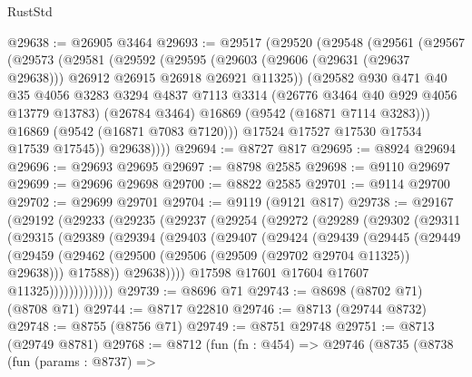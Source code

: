 \begin{lexlean}{RustStd}
\begin{coremodule}
@29638 := @26905 @3464
@29693 := @29517
    (@29520
      (@29548
        (@29561
          (@29567
            (@29573
              (@29581
                (@29592
                  (@29595
                    (@29603 (@29606 (@29631 (@29637 @29638))) @26912 @26915 @26918 @26921 @11325))
                  (@29582
                    @930
                    @471
                    @40
                    @35
                    @4056
                    @3283
                    @3294
                    @4837
                    @7113
                    @3314
                    (@26776 @3464 @40 @929 @4056 @13779 @13783)
                    (@26784 @3464)
                    @16869
                    (@9542 (@16871 @7114 @3283)))
                  @16869
                  (@9542 (@16871 @7083 @7120)))
                @17524
                @17527
                @17530
                @17534
                @17539
                @17545))
            @29638))))
@29694 := @8727 @817
@29695 := @8924 @29694
@29696 := @29693 @29695
@29697 := @8798 @2585
@29698 := @9110 @29697
@29699 := @29696 @29698
@29700 := @8822 @2585
@29701 := @9114 @29700
@29702 := @29699 @29701
@29704 := @9119 (@9121 @817)
@29738 := @29167
    (@29192
      (@29233
        (@29235
          (@29237
            (@29254
              (@29272
                (@29289
                  (@29302
                    (@29311
                      (@29315
                        (@29389
                          (@29394
                            (@29403
                              (@29407
                                (@29424
                                  (@29439
                                    (@29445
                                      (@29449
                                        (@29459
                                          (@29462
                                            (@29500
                                              (@29506 (@29509 (@29702 @29704 @11325)) @29638)))
                                          @17588))
                                      @29638))))
                              @17598
                              @17601
                              @17604
                              @17607
                              @11325)))))))))))))
@29739 := @8696 @71
@29743 := @8698 (@8702 @71) (@8708 @71)
@29744 := @8717 @22810
@29746 := @8713 (@29744 @8732)
@29748 := @8755 (@8756 @71)
@29749 := @8751 @29748
@29751 := @8713 (@29749 @8781)
@29768 := @8712
    (fun (fn : @454) =>
    @29746
      (@8735
        (@8738
          (fun (params : @8737) =>

\end{coremodule}
\end{lexlean}
